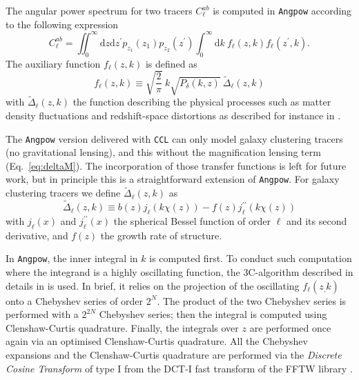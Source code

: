 \documentclass[\docopts]{\docclass}
\newcommand{\ccl}{{\tt CCL}\xspace}
\begin{document}
The angular power spectrum for two tracers $C_{\ell}^{ab}$ is computed in \texttt{Angpow} according to the following expression
\begin{equation}
  C_{\ell}^{ab} = \iint_0^\infty \mathrm{d} z \mathrm{d} z^\prime  p_{z_1}(z_1) p_{z_2}(z^\prime) \int_0^\infty \mathrm{d} k\ f_{\ell}(z, k) f_{\ell}(z^\prime, k).
  \label{eq-clz1z2-obs}
\end{equation}
The auxiliary function $f_\ell(z,k)$ is defined as
\begin{equation}
f_\ell(z,k) \equiv  \sqrt{\frac{2}{\pi}}\  k \sqrt{P_\delta(k,z)}\ \widetilde{\Delta}_\ell(z,k)\label{eq-fell-func}
\end{equation}
with $\widetilde{\Delta}_\ell(z,k)$ the function describing the physical processes such as matter density fluctuations and redshift-space distortions as described for instance in \citet{2008cmb..book.....D,2009PhRvD..80h3514Y,2010PhRvD..82h3508Y, 2011PhRvD..84d3516C,2011PhRvD..84f3505B}.

The \texttt{Angpow} version delivered with \ccl can only model galaxy clustering tracers (no gravitational lensing), and this without the magnification lensing term (Eq.~\ref{eq:deltaM}). The incorporation of those transfer functions is left for future work, but in principle this is a straightforward extension of \texttt{Angpow}. For galaxy clustering tracers we define $\widetilde{\Delta}_\ell(z,k)$ as 
\begin{equation}
 \widetilde{\Delta}_\ell(z,k) \equiv b(z) j_\ell(k \chi(z)) - f(z) j_\ell^{\prime\prime}(k \chi(z)) 
\end{equation}
with $j_\ell(x)$ and $j_\ell^{\prime\prime}(x)$ the spherical Bessel function of order $\ell$ and its second derivative, and $f(z)$ the growth rate of structure.

In \texttt{Angpow}, the inner integral in $k$ is computed first.
To conduct such computation where the integrand is a highly oscillating function, the 3C-algorithm described in details in \citet{2017A&A...602A..72C} is used. In brief, it relies on the projection of the oscillating $f_\ell(z_,k)$ onto a Chebyshev series of order $2^N$. The product of the two Chebyshev series is performed with a $2^{2N}$ Chebyshev series; then the integral is computed using Clenshaw-Curtis quadrature. Finally, the integrals over $z$ are performed once again via an optimised Clenshaw-Curtis quadrature. All the Chebyshev expansions and the Clenshaw-Curtis quadrature are performed via the \textit{Discrete Cosine Transform} of type I from the DCT-I fast transform of the FFTW library \citep{FFTW}.
\end{document}
